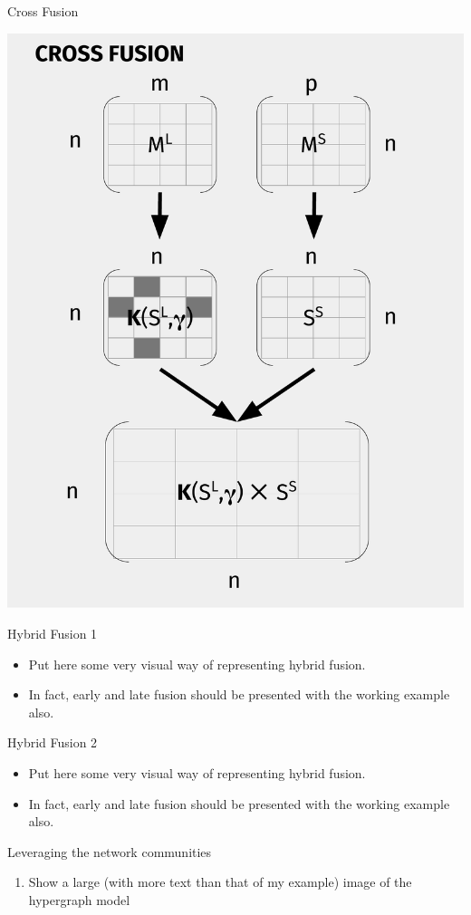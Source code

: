 \documentclass[10pt,xcolor=table]{beamer}
\begin{document}
\begin{frame}{Cross Fusion}
\begin{center}
\includegraphics[width=.55\linewidth]{image2/Chapitre3/xf_diag.pdf}
\end{center}
\end{frame}


\begin{frame}{Hybrid Fusion 1}
\begin{itemize}
\item [] \large Put here some very visual way of representing hybrid fusion.
\item [] In fact, early and late fusion should be presented with the working example also.
\end{itemize}

\end{frame}

\begin{frame}{Hybrid Fusion 2}
\begin{itemize}
\item [] \large Put here some very visual way of representing hybrid fusion.
\item [] In fact, early and late fusion should be presented with the working example also.
\end{itemize}

\end{frame}




\begin{frame}{Leveraging the network communities}
\begin{enumerate}
\item  Show a large (with more text than that of my example) image of  the hypergraph model


\end{enumerate}
\end{frame}
\end{document}
